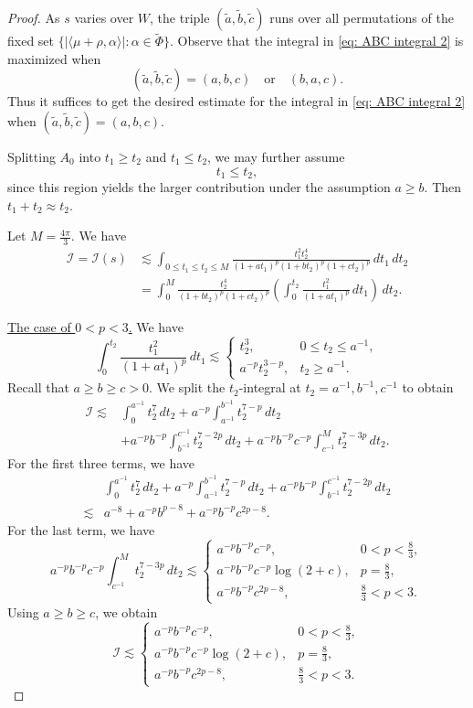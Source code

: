 \documentclass{amsart}
\numberwithin{equation}{section}
\numberwithin{equation}{section}
\begin{document}
\begin{proof}
As $s$ varies over $W$, the triple $(\widetilde{a},\widetilde{b},\widetilde{c})$ runs over all permutations of the fixed set
$\{ |\langle \mu+\rho, \alpha \rangle| : \alpha \in \widetilde{\Phi} \}$. Observe that the integral in \eqref{eq: ABC integral 2} is maximized when
\[
(\widetilde a,\widetilde b,\widetilde c)=(a,b,c)
\quad\text{or}\quad
(b,a,c).
\]
Thus it suffices to get the desired estimate for the integral in \eqref{eq: ABC integral 2} when $(\widetilde a,\widetilde b,\widetilde c)=(a,b,c)$. 

Splitting \(A_0\) into \(t_1\ge t_2\) and \(t_1\le t_2\), we may further assume 
\[t_1\le t_2,\]
since this region yields the larger contribution under the assumption $a\geq b$. Then $t_1+t_2\approx t_2$. 

Let $M=\frac{4\pi}{3}$. We have 
\begin{align*}
    \mathcal{I}=\mathcal{I}(s)&\lesssim \int_{0\leq t_1\leq t_2\leq M} 
    \frac{t_1^2t_2^4}{(1+at_1)^p(1+bt_2)^p(1+ct_2)^p}
    \,dt_1\,dt_2\\
    &=\int_0^M \frac{t_2^4}{(1+bt_2)^p(1+ct_2)^p}
\left(\int_0^{t_2}\frac{t_1^2}{(1+at_1)^p}\,dt_1\right)\,dt_2.
\end{align*}

\underline{The case of \(0<p<3\).} We have
\[
\int_0^{t_2}\frac{t_1^2}{(1+at_1)^p}\,dt_1
\lesssim
\begin{cases}
t_2^3, & 0\le t_2\le a^{-1},\\[1mm]
a^{-p}t_2^{3-p}, & t_2\ge a^{-1}.
\end{cases}
\]
Recall that $a \ge b \ge c > 0$. We split the $t_2$-integral at 
$t_2 = a^{-1}, b^{-1}, c^{-1}$ to obtain 
\begin{align*}
\mathcal I
\lesssim&
\int_0^{a^{-1}} t_2^7\,dt_2
+a^{-p}\int_{a^{-1}}^{b^{-1}} t_2^{7-p}\,dt_2\\
& +a^{-p}b^{-p}\int_{b^{-1}}^{c^{-1}} t_2^{7-2p}\,dt_2
+a^{-p}b^{-p}c^{-p}\int_{c^{-1}}^M t_2^{7-3p}\,dt_2.
\end{align*}
For the first three terms, we have 
\begin{align*}
    & \int_0^{a^{-1}} t_2^7\,dt_2
+a^{-p}\int_{a^{-1}}^{b^{-1}} t_2^{7-p}\,dt_2
+a^{-p}b^{-p}\int_{b^{-1}}^{c^{-1}} t_2^{7-2p}\,dt_2\\
\lesssim & a^{-8}+a^{-p}b^{p-8}+a^{-p}b^{-p}c^{2p-8}.
\end{align*}
For the last term, we have 
$$a^{-p}b^{-p}c^{-p}\int_{c^{-1}}^M t_2^{7-3p}\,dt_2\lesssim \begin{cases}
a^{-p}b^{-p}c^{-p}, & 0<p<\frac83,\\[1mm]
a^{-p}b^{-p}c^{-p}\log(2+c), & p=\frac83,\\[1mm]
a^{-p}b^{-p}c^{2p-8}, & \frac83<p<3.
\end{cases}$$
Using $a\geq b\geq c$,  we obtain
\[
\mathcal I\lesssim
\begin{cases}
a^{-p}b^{-p}c^{-p}, & 0<p<\frac83,\\[1mm]
a^{-p}b^{-p}c^{-p}\log(2+c), & p=\frac83,\\[1mm]
a^{-p}b^{-p}c^{2p-8}, & \frac83<p<3.
\end{cases}
\]


\end{proof}
\end{document}
